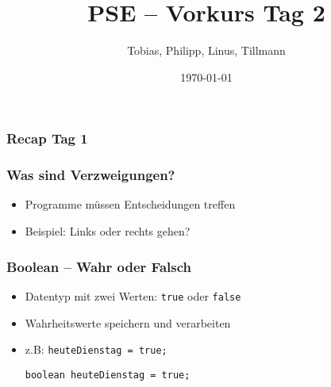 \documentclass{../../presentation}
\title{PSE – Vorkurs Tag 2}
\author{Tobias, Philipp, Linus, Tillmann}
\institute{FIUS - Fachgruppe Informatik Universität Stuttgart}
\date{\today}
\begin{document}
\begin{frame}
  \titlepage
\end{frame}

\begin{frame}
  \listoftodos
\end{frame}

\begin{frame}
  \frametitle{Recap Tag 1}
\end{frame}

\begin{frame}
  \frametitle{Was sind Verzweigungen?}
  \begin{itemize}
    \item Programme müssen Entscheidungen treffen
    \item Beispiel: Links oder rechts gehen?
  \end{itemize}
\end{frame}

\begin{frame}[fragile]
  \frametitle{Boolean – Wahr oder Falsch}
  \begin{itemize}
    \item Datentyp mit zwei Werten: \texttt{true} oder \texttt{false}
    \item Wahrheitswerte speichern und verarbeiten

    \item z.B: \texttt{heuteDienstag = true;}
    \begin{verbatim}
boolean heuteDienstag = true;
    \end{verbatim}
 
  \end{itemize}
\end{frame}
\end{document}
